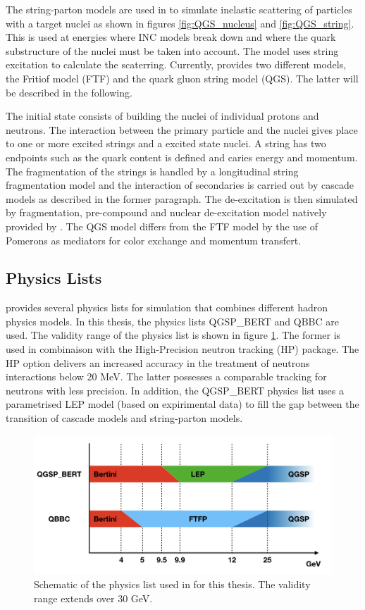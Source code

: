 The string-parton models \cite{Folger2003} are used in \geant to simulate inelastic scattering of particles with a target nuclei as shown in figures \ref{fig:QGS_nucleus} and \ref{fig:QGS_string}. This is used at energies where INC models break down and where the quark substructure of the nuclei must be taken into account. The model uses string excitation to calculate the scaterring. Currently, \geant provides two different models, the Fritiof model (FTF) and the quark gluon string model (QGS). The latter will be described in the following.

The initial state consists of building the nuclei of individual protons and neutrons. The interaction between the primary particle and the nuclei gives place to one or more excited strings and a excited state nuclei. A string has two endpoints such as the quark content is defined and caries energy and momentum. The fragmentation of the strings is handled by a longitudinal string fragmentation model and the interaction of secondaries is carried out by cascade models as described in the former paragraph. The de-excitation is then simulated by fragmentation, pre-compound and nuclear de-excitation model natively provided by \geant. The QGS model differs from the FTF model by the use of Pomerons as mediators for color exchange and momentum transfert.

\subsection{\geant Physics Lists}

\geant provides several physics lists for simulation that combines different hadron physics models. In this thesis, the physics lists QGSP\_BERT and QBBC are used. The validity range of the physics list is shown in figure \ref{fig:physics_list}. The former is used in combinaison with the High-Precision neutron tracking (HP) package. The HP option delivers an increased accuracy in the treatment of neutrons interactions below 20 MeV. The latter possesses a comparable tracking for neutrons with less precision.
In addition, the QGSP\_BERT physics list uses a parametrised LEP model (based on expirimental data) to fill the gap between the transition of cascade models and string-parton models.

\begin{figure}[htbp!]
  \centering
  \includegraphics[width=1.\linewidth]{chap4/fig/PhysicsLists.jpeg}
  \caption{Schematic of the physics list used in \geant for this thesis. The validity range extends over 30 GeV.} \label{fig:physics_list}
\end{figure}

